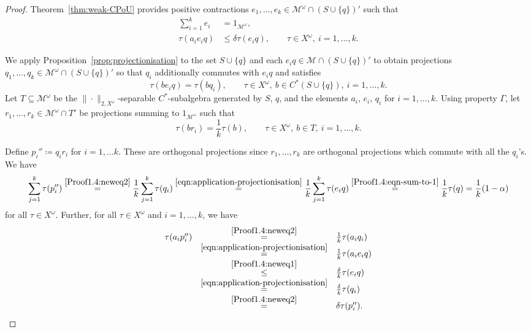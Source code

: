 \documentclass[a4paper,11pt]{amsart}
\theoremstyle{definition}
\numberwithin{equation}{section}
\numberwithin{theorem}{section}
\newcommand{\M}{\mathcal{M}}
\begin{document}
\begin{proof}
Theorem~\ref{thm:weak-CPoU} provides positive contractions $e_1, \ldots, e_k \in \M^\omega \cap (S \cup \{q\})'$ such that
\begin{align}
    \sum_{i=1}^k e_i &= 1_{\M^\omega},\label{Proof1.4:eqn-sum-to-1}\\
    \tau(a_i e_iq) &\leq \delta \tau(e_iq),\qquad \tau\in X^\omega,\ i=1,\ldots,k.\label{Proof1.4:neweq1}
\end{align}
    
We apply Proposition~\ref{prop:projectionisation} to the set $S\cup\{q\}$ and each $e_iq\in \mathcal M\cap (S\cup\{q\})'$ to obtain projections $q_1, \ldots, q_k \in \M^\omega \cap (S\cup\{q\})'$ so that $q_i$ additionally commutes with $e_iq$ and satisfies 
\begin{equation}\label{eqn:application-projectionisation}
    \tau(b e_iq) = \tau(bq_i),\qquad \tau\in X^\omega,\ b\in C^*(S\cup\{q\}),\ i=1,\ldots,k.
\end{equation} 
Let $T \subseteq \M^\omega$ be the $\|\cdot\|_{2,X^\omega}$-separable $C^*$-subalgebra generated by $S$, $q$, and the elements $a_i$, $e_i$, $q_i$ for $i=1,\ldots,k$.
Using property $\Gamma$, let $r_1, \ldots, r_k \in \M^\omega \cap T'$ be projections summing to $1_{\mathcal M^\omega}$ such that 
\begin{equation}\label{Proof1.4:neweq2}
   \tau(b r_i) = \frac1k \tau(b),\qquad \tau\in X^\omega,\ b\in T,\ i=1,\ldots,k. 
\end{equation}
	
Define $p_i'' \coloneqq q_i r_i$ for $i = 1, \ldots k$.  
These are orthogonal projections since $r_1,\dots,r_k$ are orthogonal projections which commute with all the $q_i$'s.
We have
\begin{equation}
    \sum_{j=1}^k \tau(p_i'') \stackrel{\eqref{Proof1.4:neweq2}}{=} \frac1k \sum_{j=1}^k \tau(q_i) \stackrel{\eqref{eqn:application-projectionisation}}{=} \frac1k \sum_{j=1}^k  \tau(e_iq) \stackrel{\eqref{Proof1.4:eqn-sum-to-1}}{=} \frac1k\tau(q) = \frac1k (1 - \alpha)
\end{equation}
for all $\tau \in X^\omega$.  
Further, for all $\tau \in X^\omega$ and $i = 1, \ldots, k$, we have
\begin{equation}\begin{array}{rcl}
    \tau(a_i p_i'') &\stackrel{\eqref{Proof1.4:neweq2}}{=}& \frac1k \tau(a_i q_i) \\
    &\stackrel{\eqref{eqn:application-projectionisation}}{=}& \frac1k \tau(a_i e_iq) \\
    &\stackrel{\eqref{Proof1.4:neweq1}}{\leq}& \frac{\delta}{k} \tau(e_iq) \\
    &\stackrel{\eqref{eqn:application-projectionisation}}{=}& \frac{\delta}{k} \tau(q_i)  \\
    &\stackrel{\eqref{Proof1.4:neweq2}}{=}&  \delta\tau(p_i'').
    \end{array}
\end{equation}


\end{proof}
\end{document}
